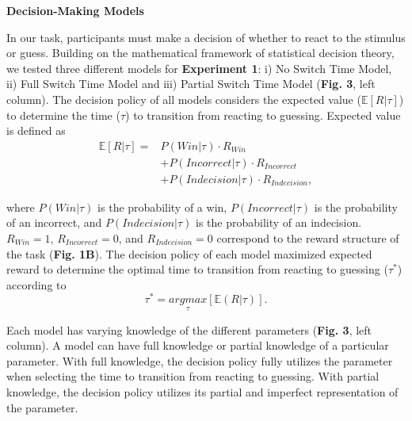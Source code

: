 \documentclass[12pt]{article}
\newcommand\boldblue[1]{\textcolor{mydarkblue}{\textbf{#1}}}
\begin{document}
\vspace{1mm}
\noindent \boldblue{{{Decision-Making Models}}}

\noindent In our task, participants must make a decision of whether to react to the stimulus or guess. Building on the mathematical framework of statistical decision theory\autocite*{trommershauserStatisticalDecisionTheory2003}, we tested three different models for \boldblue{Experiment 1}: i) No Switch Time Model, ii) Full Switch Time Model and iii) Partial Switch Time Model (\boldblue{Fig. 3}, left column). The decision policy of all models considers the expected value ($\mathbb{E}[R|\tau]$) to determine the time ($\tau$) to transition from reacting to guessing. Expected value is defined as
\setlength{\belowdisplayskip}{4pt} \setlength{\belowdisplayshortskip}{4pt} %
\setlength{\abovedisplayskip}{4pt} \setlength{\abovedisplayshortskip}{4pt}
\begin{align}
    \mathbb{E}[R|\tau] = & P(Win|\tau) \cdot R_{Win} \nonumber \\ &+ P(Incorrect|\tau) \cdot R_{Incorrect} \nonumber \\ &+ P(Indecision|\tau) \cdot R_{Indecision},
\end{align}

\noindent where $P(Win|\tau)$ is the probability of a win, $P(Incorrect|\tau)$ is the probability of an incorrect, and $P(Indecision|\tau)$ is the probability of an indecision. $R_{Win} = 1$, $R_{Incorrect} = 0$, and $R_{Indecision} = 0$ correspond to the reward structure of the task (\boldblue{Fig. 1B}). The decision policy of each model maximized expected reward to determine the optimal time to transition from reacting to guessing ($\tau^*$) according to
\begin{equation}
    \tau^* = \underset{\tau}{argmax}[\mathbb{E}(R|\tau)].
\end{equation}

Each model has varying knowledge of the different parameters (\boldblue{Fig. 3}, left column). A model can have full knowledge or partial knowledge of a particular parameter. With full knowledge, the decision policy fully utilizes the parameter when selecting the time to transition from reacting to guessing. With partial knowledge, the decision policy utilizes its partial and imperfect representation of the parameter. 
\end{document}
